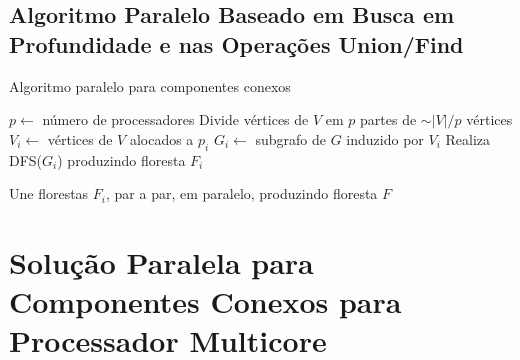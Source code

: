 \documentclass[12pt]{article}
\begin{document}
\subsection{Algoritmo Paralelo Baseado em Busca em Profundidade e nas Operações Union/Find}

{\color{gray}\lipsum[1]}

\begin{algorithm}[h]
    \DontPrintSemicolon
    \caption{Algoritmo paralelo para componentes conexos}
    {
        $p \gets$ número de processadores\;
        Divide vértices de $V$ em $p$ partes de $\sim|V|/p$ vértices\;
        {
            $V_i \gets$ vértices de $V$ alocados a $p_i$\;
            $G_i \gets$ subgrafo de $G$ induzido por $V_i$\;
            Realiza DFS($G_i$) produzindo floresta $F_i$\;
        }

        Une florestas $F_i$, par a par, em paralelo, produzindo floresta $F$\;
        
    }
\end{algorithm}

\section{Solução Paralela para Componentes Conexos para Processador Multicore}

{\color{gray}\lipsum[1]}
\end{document}
